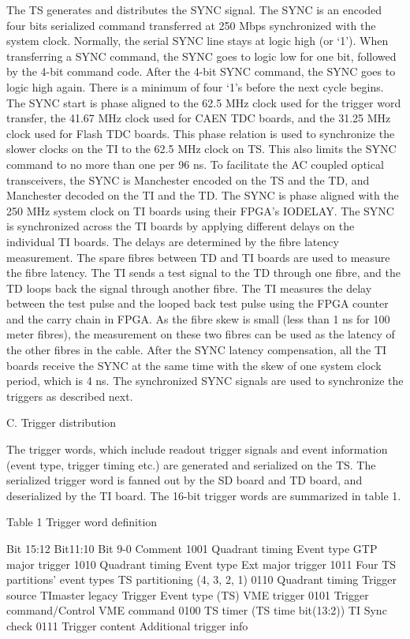 The TS generates and distributes the SYNC signal.  The SYNC is an encoded four bits serialized command transferred at 250 Mbps synchronized with the system clock.  Normally, the serial SYNC line stays at logic high (or ‘1’).  When transferring a SYNC command, the SYNC goes to logic low for one bit, followed by the 4-bit command code.  After the 4-bit SYNC command, the SYNC goes to logic high again.  There is a minimum of four ‘1’s before the next cycle begins.  The SYNC start is phase aligned to the 62.5 MHz clock used for the trigger word transfer, the 41.67 MHz clock used for CAEN TDC boards, and the 31.25 MHz clock used for Flash TDC boards.  This phase relation is used to synchronize the slower clocks on the TI to the 62.5 MHz clock on TS.  This also limits the SYNC command to no more than one per 96 ns.  To facilitate the AC coupled optical transceivers, the SYNC is Manchester encoded on the TS and the TD, and Manchester decoded on the TI and the TD.
The SYNC is phase aligned with the 250 MHz system clock on TI boards using their FPGA’s IODELAY.  The SYNC is synchronized across the TI boards by applying different delays on the individual TI boards.  The delays are determined by the fibre latency measurement.  
The spare fibres between TD and TI boards are used to measure the fibre latency.  The TI sends a test signal to the TD through one fibre, and the TD loops back the signal through another fibre.  The TI measures the delay between the test pulse and the looped back test pulse using the FPGA counter and the carry chain in FPGA.  As the fibre skew is small (less than 1 ns for 100 meter fibres), the measurement on these two fibres can be used as the latency of the other fibres in the cable.  
After the SYNC latency compensation, all the TI boards receive the SYNC at the same time with the skew of one system clock period, which is 4 ns.  The synchronized SYNC signals are used to synchronize the triggers as described next.

C.	Trigger distribution

The trigger words, which include readout trigger signals and event information (event type, trigger timing etc.) are generated and serialized on the TS.  The serialized trigger word is fanned out by the SD board and TD board, and deserialized by the TI board.  The 16-bit trigger words are summarized in table 1.  



Table 1 Trigger word definition

Bit 15:12	Bit11:10	Bit 9-0	Comment
1001	Quadrant timing	Event type	GTP major trigger
1010	Quadrant timing	Event type	Ext major trigger
1011	Four TS partitions’ event types 	TS partitioning (4, 3, 2, 1)
0110	Quadrant timing	Trigger source 	TImaster legacy Trigger
		Event type	(TS) VME trigger
0101	Trigger command/Control	VME command
0100	TS timer (TS time bit(13:2))	TI Sync check
0111	Trigger content	Additional trigger info

